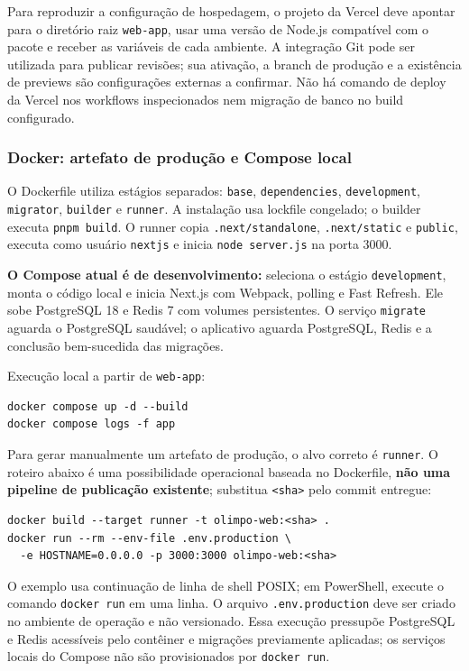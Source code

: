 \documentclass[12pt,a4paper]{article}
\begin{document}
Para reproduzir a configuração de hospedagem, o projeto da Vercel deve apontar para o diretório raiz \texttt{web-app}, usar uma versão de Node.js compatível com o pacote e receber as variáveis de cada ambiente. A integração Git pode ser utilizada para publicar revisões; sua ativação, a branch de produção e a existência de previews são configurações externas a confirmar. Não há comando de deploy da Vercel nos workflows inspecionados nem migração de banco no build configurado.

\subsubsection{Docker: artefato de produção e Compose local}
O Dockerfile utiliza estágios separados: \texttt{base}, \texttt{dependencies}, \texttt{development}, \texttt{migrator}, \texttt{builder} e \texttt{runner}. A instalação usa lockfile congelado; o builder executa \texttt{pnpm build}. O runner copia \texttt{.next/standalone}, \texttt{.next/static} e \texttt{public}, executa como usuário \texttt{nextjs} e inicia \texttt{node server.js} na porta 3000.

\textbf{O Compose atual é de desenvolvimento:}  seleciona o estágio \texttt{development}, monta o código local e inicia Next.js com Webpack, polling e Fast Refresh. Ele sobe PostgreSQL 18 e Redis 7 com volumes persistentes. O serviço \texttt{migrate} aguarda o PostgreSQL saudável; o aplicativo aguarda PostgreSQL, Redis e a conclusão bem-sucedida das migrações.

Execução local a partir de \texttt{web-app}:
\begin{verbatim}
docker compose up -d --build
docker compose logs -f app
\end{verbatim}

Para gerar manualmente um artefato de produção, o alvo correto é \texttt{runner}. O roteiro abaixo é uma possibilidade operacional baseada no Dockerfile, \textbf{não uma pipeline de publicação existente}; substitua \texttt{<sha>} pelo commit entregue:
\begin{verbatim}
docker build --target runner -t olimpo-web:<sha> .
docker run --rm --env-file .env.production \
  -e HOSTNAME=0.0.0.0 -p 3000:3000 olimpo-web:<sha>
\end{verbatim}

O exemplo usa continuação de linha de shell POSIX; em PowerShell, execute o comando \texttt{docker run} em uma linha. O arquivo \texttt{.env.production} deve ser criado no ambiente de operação e não versionado. Essa execução pressupõe PostgreSQL e Redis acessíveis pelo contêiner e migrações previamente aplicadas; os serviços locais do Compose não são provisionados por \texttt{docker run}.
\end{document}
